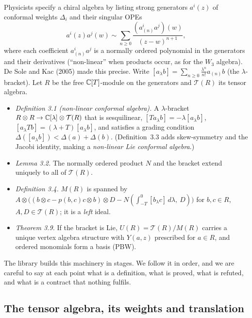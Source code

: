 Physicists specify a chiral algebra by listing strong generators $a^i(z)$ of conformal weights $\Delta_i$ and their
singular OPEs
\begin{equation*}
a^i(z)a^j(w)\sim\sum_{n\ge0}\frac{(a^i_{(n)}a^j)(w)}{(z-w)^{n+1}},
\end{equation*}
where each coefficient $a^i_{(n)}a^j$ is a normally ordered polynomial in the generators and their derivatives
(``non-linear'' when products occur, as for the $W_3$ algebra). De Sole and Kac (2005) made this precise. Write
$[a_\lambda b] = \sum_{n\ge0}\frac{\lambda^n}{n!}a_{(n)}b$ (the $\lambda$-bracket). Let $R$ be the free
${\mathbb{C}}[T]$-module on the generators and $\mathcal T(R)$ its tensor algebra.
\begin{itemize}
\item \emph{Definition 3.1 (non-linear conformal algebra).} A $\lambda$-bracket $R\otimes R\to{\mathbb{C}}[\lambda]\otimes
  \mathcal T(R)$ that is sesquilinear, $[Ta_\lambda b] = -\lambda[a_\lambda b]$, $[a_\lambda Tb] = (\lambda+T)[a_\lambda b]$, and
  satisfies a grading condition $\Delta([a_\lambda b])<\Delta(a)+\Delta(b)$. (Definition~3.3 adds skew-symmetry and the Jacobi
  identity, making a \emph{non-linear Lie conformal algebra}.)
\item \emph{Lemma 3.2.} The normally ordered product $N$ and the bracket extend uniquely to all of $\mathcal T(R)$.
\item \emph{Definition 3.4.} $M(R)$ is spanned by $A\otimes\bigl((b\otimes c - p(b,c)c\otimes b)\otimes D -
  N(\int_{-T}^0[b_\lambda c]\,d\lambda,\ D)\bigr)$ for $b,c\in R$, $A,D\in\mathcal T(R)$; it is a \emph{left} ideal.
\item \emph{Theorem 3.9.} If the bracket is Lie, $U(R) = \mathcal T(R)/M(R)$ carries a unique vertex algebra structure
  with $Y(a,z)$ prescribed for $a\in R$, and ordered monomials form a basis (PBW).
\end{itemize}
The library builds this machinery in stages. We follow it in order, and we are careful to say at each point what is a
definition, what is proved, what is refuted, and what is a contract that nothing fulfils.

\subsection{The tensor algebra, its weights and translation}

